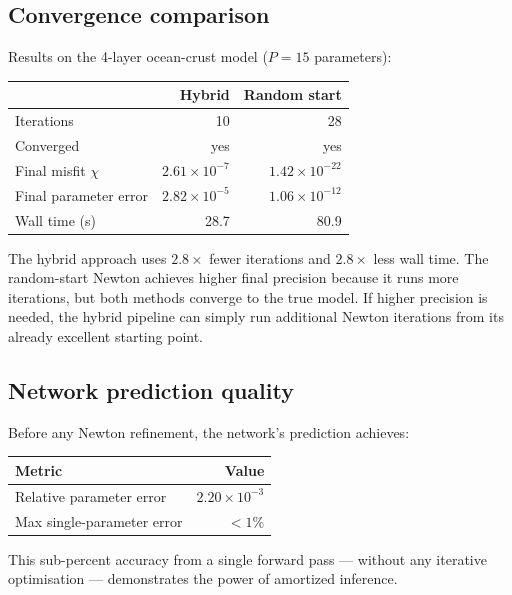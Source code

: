 \documentclass[11pt,a4paper]{article}
\theoremstyle{plain}
\theoremstyle{remark}
\begin{document}
\subsection{Convergence comparison}

Results on the 4-layer ocean-crust model ($P = 15$ parameters):

\begin{center}
\renewcommand{\arraystretch}{1.3}
\begin{tabular}{lrr}
  \toprule
  & \textbf{Hybrid} & \textbf{Random start} \\
  \midrule
  Iterations          & 10        & 28 \\
  Converged           & yes       & yes \\
  Final misfit $\chi$ & $2.61\times 10^{-7}$ & $1.42\times 10^{-22}$ \\
  Final parameter error & $2.82\times 10^{-5}$ & $1.06\times 10^{-12}$ \\
  Wall time (s)       & 28.7      & 80.9 \\
  \bottomrule
\end{tabular}
\end{center}

\noindent The hybrid approach uses $2.8\times$ fewer iterations and
$2.8\times$ less wall time.  The random-start Newton achieves higher
final precision because it runs more iterations, but both methods
converge to the true model.  If higher precision is needed, the hybrid
pipeline can simply run additional Newton iterations from its already
excellent starting point.

\subsection{Network prediction quality}

Before any Newton refinement, the network's prediction achieves:

\begin{center}
\renewcommand{\arraystretch}{1.3}
\begin{tabular}{lr}
  \toprule
  \textbf{Metric} & \textbf{Value} \\
  \midrule
  Relative parameter error & $2.20 \times 10^{-3}$ \\
  Max single-parameter error & $< 1\%$ \\
  \bottomrule
\end{tabular}
\end{center}

\noindent This sub-percent accuracy from a single forward pass ---
without any iterative optimisation --- demonstrates the power of
amortized inference.
\end{document}
